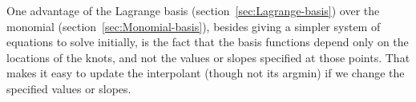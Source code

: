 % 
% 
 
\setcounter{currentlevel}{\value{baseSectionLevel}}

\cite{wiki:Newton-polynomial}

One advantage of the Lagrange basis 
(section~\ref{sec:Lagrange-basis})
over the monomial (section~\ref{sec:Monomial-basis}),
besides giving a simpler system of equations to solve initially,
is the fact that the basis functions depend only on the locations
of the knots, and not the values or slopes specified at those 
points. 
That makes it easy to update the interpolant 
(though not its argmin) if we change the specified values
or slopes.
 
